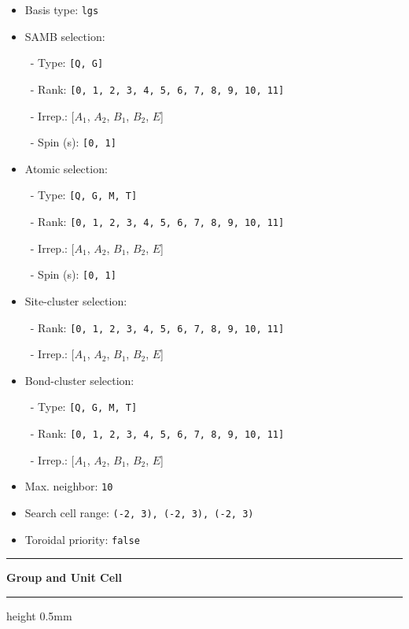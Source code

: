 \documentclass[fleqn,10pt,landscape]{jsarticle}
\begin{document}
\begin{itemize}
\item Basis type: \texttt{lgs}

\item SAMB selection:

\, - Type: \texttt{[Q, G]}

\, - Rank: \texttt{[0, 1, 2, 3, 4, 5, 6, 7, 8, 9, 10, 11]}

\, - Irrep.: [$A_{1}$, $A_{2}$, $B_{1}$, $B_{2}$, $E$]

\, - Spin (s): \texttt{[0, 1]}

\item Atomic selection:

\, - Type: \texttt{[Q, G, M, T]}

\, - Rank: \texttt{[0, 1, 2, 3, 4, 5, 6, 7, 8, 9, 10, 11]}

\, - Irrep.: [$A_{1}$, $A_{2}$, $B_{1}$, $B_{2}$, $E$]

\, - Spin (s): \texttt{[0, 1]}

\item Site-cluster selection:

\, - Rank: \texttt{[0, 1, 2, 3, 4, 5, 6, 7, 8, 9, 10, 11]}

\, - Irrep.: [$A_{1}$, $A_{2}$, $B_{1}$, $B_{2}$, $E$]

\item Bond-cluster selection:

\, - Type: \texttt{[Q, G, M, T]}

\, - Rank: \texttt{[0, 1, 2, 3, 4, 5, 6, 7, 8, 9, 10, 11]}

\, - Irrep.: [$A_{1}$, $A_{2}$, $B_{1}$, $B_{2}$, $E$]

\item Max. neighbor: \texttt{10}

\item Search cell range: \texttt{(-2, 3), (-2, 3), (-2, 3)}

\item Toroidal priority: \texttt{false}

\end{itemize}
\vspace{5mm}
\noindent \rule[0.5mm]{5mm}{0.5mm}\hspace{3mm}\textbf{Group and Unit Cell}\hspace{3mm}\leaders\hrule height 0.5mm\hfill\kern0pt
\vspace{3mm}
\end{document}
